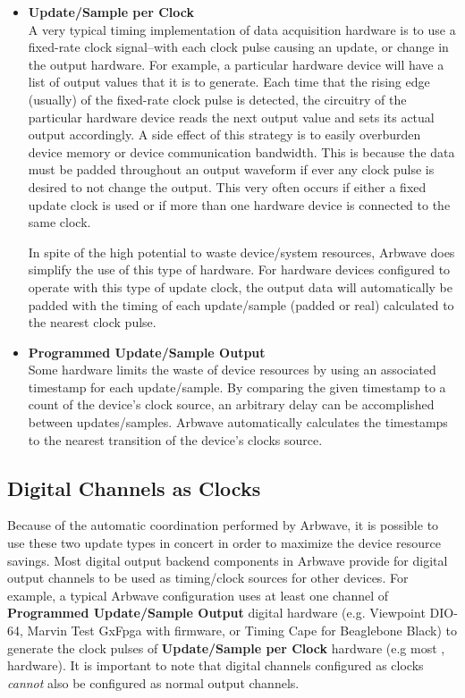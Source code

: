 \begin{itemize}
\item \textbf{Update/Sample per Clock}\\
  A very typical timing implementation of data acquisition hardware is to use a
  fixed-rate clock signal--with each clock pulse causing an update, or change in
  the output hardware.  For example, a particular hardware device will have a
  list of output values that it is to generate.  Each time that the rising edge
  (usually) of the fixed-rate clock pulse is detected, the circuitry of the
  particular hardware device reads the next output value and sets its actual
  output accordingly.  A side effect of this strategy is to easily overburden
  device memory or device communication bandwidth.  This is because the data
  must be padded throughout an output waveform if ever any clock pulse is
  desired to not change the output.  This very often occurs if either a fixed
  update clock is used or if more than one hardware device is connected to the
  same clock.

  In spite of the high potential to waste device/system resources, Arbwave does
  simplify the use of this type of hardware.  For hardware devices configured to
  operate with this type of update clock, the output data will automatically be
  padded with the timing of each update/sample (padded or real) calculated to
  the nearest clock pulse.

\item \textbf{Programmed Update/Sample Output}\\
  Some hardware limits the waste of device resources by using an associated
  timestamp for each update/sample.  By comparing the given timestamp to a count
  of the device's clock source, an arbitrary delay can be accomplished between
  updates/samples.  Arbwave automatically calculates the timestamps to the
  nearest transition of the device's clocks source.
\end{itemize}

\subsection{Digital Channels as Clocks}
Because of the automatic coordination performed by Arbwave, it is possible to
use these two update types in concert in order to maximize the device resource
savings.  Most digital output backend components in Arbwave provide for digital
output channels to be used as timing/clock sources for other devices.
For example, a typical Arbwave configuration uses at least one channel
of \textbf{Programmed Update/Sample Output} digital hardware (e.g. Viewpoint
DIO-64, Marvin Test GxFpga with  firmware, or  Timing Cape
for Beaglebone Black) to generate the clock pulses of
\textbf{Update/Sample per Clock} hardware (e.g most , 
hardware).  It is important to note that digital channels configured as clocks
\textit{cannot} also be configured as normal output channels.

